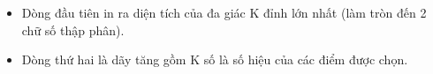 \begin{itemize}
	\item     Dòng đầu tiên in ra diện tích của đa giác K đỉnh lớn nhất (làm tròn đến 2 chữ số thập phân).   
	\item     Dòng thứ hai là dãy tăng gồm K số là số hiệu của các điểm được chọn.   
\end{itemize}

\